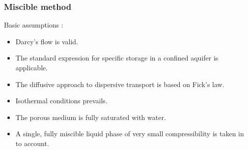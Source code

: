 \documentclass[review]{elsarticle}
\newcommand{\mbf}[1]{{\mathbf{#1}}}%
\begin{document}
\subsubsection{Miscible method}
Basic assumptions \cite{guo2002user}: 
\begin{itemize}
\item Darcy's flow is valid.  
\item The standard expression for specific storage in a confined aquifer is applicable.
\item The diffusive approach to dispersive transport is based on Fick's law.
\item Isothermal conditions prevails. 
\item The porous medium is fully saturated with water.
\item A single, fully miscible liquid phase of very small compressibility is taken in to account. 
\end{itemize}


\end{document}
